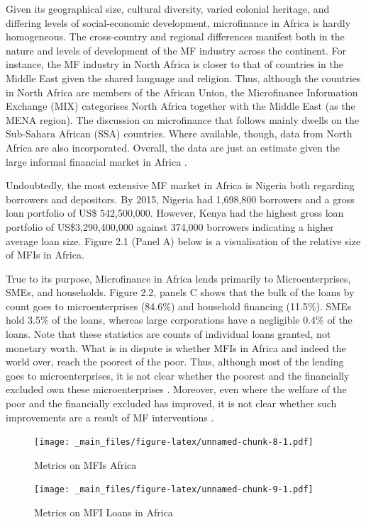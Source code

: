 \documentclass[a4paper, nobind]{templates/ociamthesis}
\begin{document}
\noindent Given its geographical size, cultural diversity, varied colonial heritage, and differing levels of social-economic development, microfinance in Africa is hardly homogeneous. The cross-country and regional differences manifest both in the nature and levels of development of the MF industry across the continent. For instance, the MF industry in North Africa is closer to that of countries in the Middle East given the shared language and religion. Thus, although the countries in North Africa are members of the African Union, the Microfinance Information Exchange (MIX) categorises North Africa together with the Middle East (as the MENA region). The discussion on microfinance that follows mainly dwells on the Sub-Sahara African (SSA) countries. Where available, though, data from North Africa are also incorporated. Overall, the data are just an estimate given the large informal financial market in Africa \autocite{klapper2015role}.

Undoubtedly, the most extensive MF market in Africa is Nigeria both regarding borrowers and depositors. By 2015, Nigeria had 1,698,800 borrowers and a gross loan portfolio of US\$ 542,500,000. However, Kenya had the highest gross loan portfolio of US\$3,290,400,000 against 374,000 borrowers indicating a higher average loan size. Figure 2.1 (Panel A) below is a visualisation of the relative size of MFIs in Africa.

True to its purpose, Microfinance in Africa lends primarily to Microenterprises, SMEs, and households. Figure 2.2, panels C shows that the bulk of the loans by count goes to microenterprises (84.6\%) and household financing (11.5\%). SMEs hold 3.5\% of the loans, whereas large corporations have a negligible 0.4\% of the loans. Note that these statistics are counts of individual loans granted, not monetary worth. What is in dispute is whether MFIs in Africa and indeed the world over, reach the poorest of the poor. Thus, although most of the lending goes to microenterprises, it is not clear whether the poorest and the financially excluded own these microenterprises \autocite{beck2014sme}. Moreover, even where the welfare of the poor and the financially excluded has improved, it is not clear whether such improvements are a result of MF interventions \autocite{awaworyi2016has}.

\newpage
\begin{landscape}

\begin{figure}
\centering
\texttt{[image: \_main\_files/figure-latex/unnamed-chunk-8-1.pdf]}
\caption{\label{fig:unnamed-chunk-8}Metrics on MFIs Africa}
\end{figure}

\newpage

\begin{figure}
\centering
\texttt{[image: \_main\_files/figure-latex/unnamed-chunk-9-1.pdf]}
\caption{\label{fig:unnamed-chunk-9}Metrics on MFI Loans in Africa}
\end{figure}

\end{landscape}
\newpage
\end{document}
